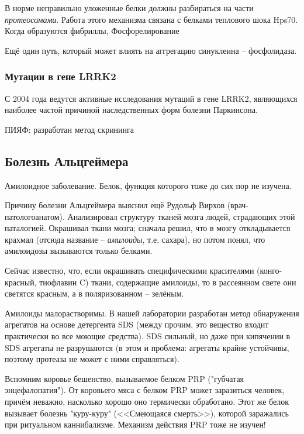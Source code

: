 \documentclass[main.tex]{subfiles}
\begin{document}
\subsubsection{}

В норме неправильно уложенные белки должны разбираться на части \emph{протеосомами}. Работа этого механизма связана с белками теплового шока Hps70.
Когда образуются фибриллы, 
Фосфорелирование

Ещё один путь, который может влиять на аггрегацию синуклеина -- фосфолидаза.

\subsubsection{Мутации в гене LRRK2}

С 2004 года ведутся активные исследования мутаций в гене LRRK2, являющихся наиболее частой причиной наследственных форм болезни Паркинсона.

ПИЯФ: разработан метод скрининга

\subsection{Болезнь Альцгеймера}

Амилоидное заболевание.
Белок, функция которого тоже до сих пор не изучена.

Причину болезни Альцгеймера выяснил ещё Рудольф Вирхов (врач-па\-то\-ло\-го\-ана\-том).
Анализировал структуру тканей мозга людей, страдающих этой паталогией.
Окрашивал ткани мозга; сначала решил, что в мозгу откладывается крахмал (отсюда название -- \textit{амилоиды}, т.е. сахара), но потом понял, что амилоидозы вызываются только белками.

Сейчас известно, что, если окрашивать специфическими красителями (конго-красный, тиофлавин C) ткани, содержащие амилоиды, то в рассеянном свете они светятся красным, а в поляризованном -- зелёным.

Амилоиды малорастворимы.
В нашей лаборатории разработан метод обнаружения агрегатов на основе детергента SDS (между прочим, это вещество входит практически во все моющие средства).
SDS сильный, но даже при кипячении в SDS агрегаты не разрушаются
(в этом и проблема: агрегаты крайне устойчивы, поэтому протеаза не может с ними справляться).

Вспомним коровье бешенство, вызываемое белком  PRP ("губчатая энцефалопатия").
От коровьего мяса с белком PRP может заразиться человек, причём неважно, насколько хорошо оно термически обработано.
Этот же белок вызывает болезнь "куру-куру" (<<Смеющаяся смерть>>), которой заражались при ритуальном каннибализме.
Механизм действия PRP тоже не изучен!
\end{document}
